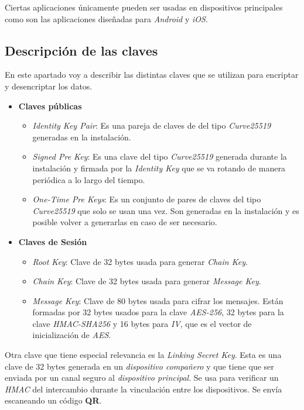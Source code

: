 Ciertas aplicaciones únicamente pueden ser usadas en dispositivos principales como son las aplicaciones diseñadas para \emph{Android} y \emph{iOS}.

\subsection{Descripción de las claves}
En este apartado voy a describir las distintas claves que se utilizan para encriptar y desencriptar los datos.
\begin{itemize}
	\item \textbf{Claves públicas}
		\begin{itemize}
			\item \emph{Identity Key Pair}: Es una pareja de claves de del tipo \emph{Curve25519} generadas en la instalación.
			\item \emph{Signed Pre Key}: Es una clave del tipo \emph{Curve25519} generada durante la instalación y firmada por la \emph{Identity Key} que se va rotando de manera periódica a lo largo del tiempo.
			\item \emph{One-Time Pre Keys}: Es un conjunto de pares de claves del tipo \emph{Curve25519} que solo se usan una vez. Son generadas en la instalación y es posible volver a generarlas en caso de ser necesario.
		\end{itemize}
	\item \textbf{Claves de Sesión}
		\begin{itemize}
			\item \emph{Root Key}: Clave de 32 bytes usada para generar \emph{Chain Key}.
			\item \emph{Chain Key}: Clave de 32 bytes usada para generar \emph{Message Key}.
			\item \emph{Message Key}: Clave de 80 bytes usada para cifrar los mensajes. Están formadas por 32 bytes usados para la clave \emph{AES-256}, 32 bytes para la clave \emph{HMAC-SHA256} y 16 bytes para \emph{IV}, que es el vector de inicialización de \emph{AES}.
		\end{itemize}
\end{itemize}

Otra clave que tiene especial relevancia es la \emph{Linking Secret Key}. Esta es una clave de 32 bytes generada en un \emph{dispositivo compañero} y que tiene que ser enviada por un canal seguro al \emph{dispositivo principal}. Se usa para verificar un \emph{HMAC} del intercambio durante la vinculación entre los dispositivos. Se envía escaneando un código \textbf{QR}.

